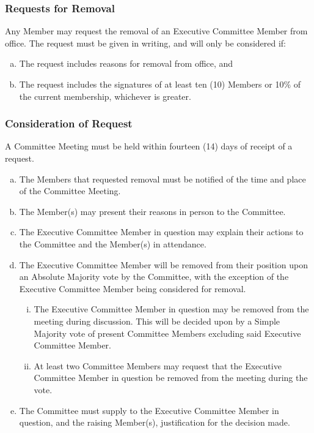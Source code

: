 \documentclass[a4paper,12pt]{article}
\begin{document}
\subsubsection{Requests for Removal}

Any Member may request the removal of an Executive Committee Member from office. The request must be given in writing, and will only be considered if:

\begin{enumerate}[a)]
	\item The request includes reasons for removal from office, and
	\item The request includes the signatures of at least ten (10) Members or 10\% of the current membership, whichever is greater.
\end{enumerate}

\subsubsection{Consideration of Request}

A Committee Meeting must be held within fourteen (14) days of receipt of a request.

\begin{enumerate}[a)]
	\item The Members that requested removal must be notified of the time and place of the Committee Meeting.
	\item The Member(s) may present their reasons in person to the Committee.
	\item The Executive Committee Member in question may explain their actions to the Committee and the Member(s) in attendance.
	\item The Executive Committee Member will be removed from their position upon an Absolute Majority vote by the Committee, with the exception of the Executive Committee Member being considered for removal.
	\begin{enumerate}[i)]
		\item The Executive Committee Member in question may be removed from the meeting during discussion. This will be decided upon by a Simple Majority vote of present Committee Members excluding said Executive Committee Member.
		\item At least two Committee Members may request that the Executive Committee Member in question be removed from the meeting during the vote.
	\end{enumerate}
	\item The Committee must supply to the Executive Committee Member in question, and the raising Member(s), justification for the decision made.
\end{enumerate}
\end{document}
